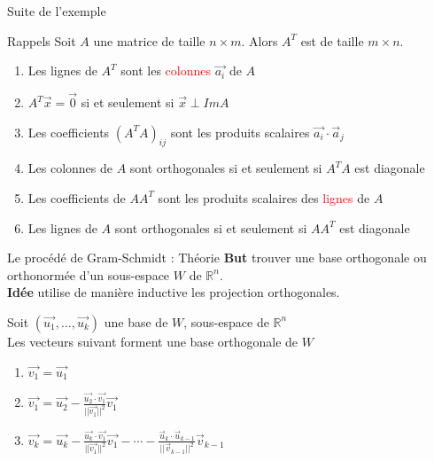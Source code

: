 

\begin{parag}{Suite de l'exemple}
    
\end{parag}
\begin{parag}{Rappels}
    Soit $A$ une matrice de taille 
    $n \times m$. Alors $A^T$ est de taille $m \times n$.
    \begin{enumerate}
        \item Les lignes de $A^T$ sont les \textcolor{red}{colonnes} $\vec{a_i}$ de $A$
        \item $A^T\vec{x} = \vec{0}$ si et seulement si $\vec{x} \perp ImA$
        \item Les coefficients $(A^TA)_{ij}$ sont les produits scalaires $\vec{a_i} \cdot \vec{a}_j$
        \item Les colonnes de $A$ sont orthogonales si et seulement si $A^TA$ est diagonale
        \item Les coefficients de $AA^T$ sont les produits scalaires des \textcolor{red}{lignes} de $A$
        \item Les lignes de $A$ sont orthogonales si et seulement si $AA^T$ est diagonale
    \end{enumerate}
\end{parag}

\begin{parag}{Le procédé de Gram-Schmidt : Théorie}
    \textbf{But} trouver une base orthogonale ou orthonormée d'un sous-espace $W$ de $\mathbb{R}^n$.
    \\
    \textbf{Idée} utilise de manière inductive les projection orthogonales.
    \begin{theoreme}
        Soit $(\vec{u_1}, \dots, \vec{u_k})$ une base de $W$, sous-espace de $\mathbb{R}^n$\\
        Les vecteurs suivant forment une base orthogonale de $W$
        \begin{enumerate}
            \item $\vec{v_1} = \vec{u_1}$
            \item $\vec{v_1} = \vec{u_2} - \frac{\vec{u_2}\cdot \vec{v_1}}{||\vec{v_1}||^2}\vec{v_1}$
            \item $\vec{v_k} = \vec{u_k} - \frac{\vec{u_k}\cdot\vec{v_1}}{||\vec{v_1}||^2}\vec{v_1} - \cdots - \frac{\vec{u}_k\cdot\vec{u}_{k-1}}{||\vec{v}_{k-1}||^2}\vec{v}_{k-1}$
        \end{enumerate}
    \end{theoreme}
\end{parag}

